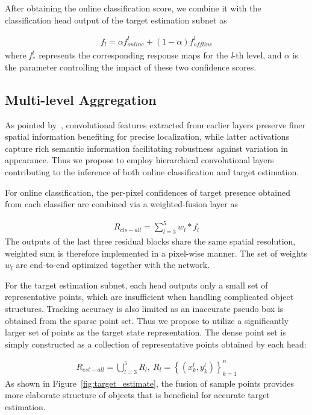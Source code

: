 \documentclass[runningheads]{llncs}
\begin{document}
After obtaining the online classification score, we combine it with the
classification head output of the target estimation subnet as

\begin{align}
f_{l} = \alpha f_{\textit{online}}^{l} + \left( 1 - \alpha \right)f_{\textit{offline}}^{l}
\end{align}
where\(\ f_{*}^{l}\) represents the corresponding response maps for the
\emph{l}-th level, and \(\alpha\) is the parameter controlling the
impact of these two confidence scores.
\subsection{Multi-level Aggregation}
As pointed by~\cite{HCFST,HCFT}, convolutional features extracted from earlier
layers preserve finer spatial information benefiting for precise
localization, while latter activations capture rich semantic information
facilitating robustness against variation in appearance. Thus
we propose to employ hierarchical convolutional layers contributing to the inference of both online classification and target estimation.

For online classification, the per-pixel confidences of target
presence obtained from each classifier are combined via a
weighted-fusion layer as

\begin{align}
R_{cls - all} = \sum_{l = 3}^{5}{w_{l}*f_{l}}
\end{align}
The outputs of the last three residual blocks share the same
spatial resolution, weighted sum is therefore implemented in a pixel-wise manner.
The set of weights \(w_{l}\) are end-to-end optimized
together with the network.

For the target estimation subnet, each head outputs only a small set of
representative points, which are insufficient when handling complicated
object structures. Tracking accuracy is also limited as an inaccurate
pseudo box is obtained from the sparse point set. Thus we propose
to utilize a significantly larger set of points as the target state
representation. The dense point set is simply constructed as a
collection of representative points obtained by each head:

\begin{align}
R_{est - all} = \bigcup_{l = 3}^{5}R_{l},\ R_{l} = \left\{ \left( x_{k}^{l},y_{k}^{l} \right) \right\}_{k = 1}^{n}
\end{align}
As shown in Figure~\ref{fig:target_estimate}, the fusion of sample points provides more
elaborate structure of objects that is beneficial for accurate target
estimation.
\end{document}

